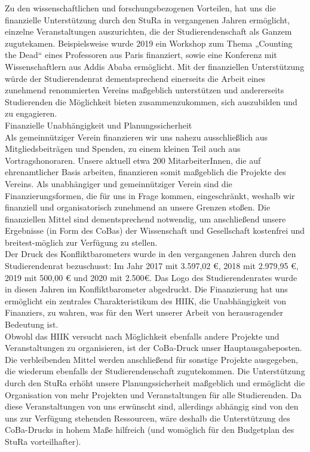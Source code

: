 {    Zu den wissenschaftlichen und forschungsbezogenen Vorteilen, hat uns die finanzielle Unterstützung durch den StuRa in vergangenen Jahren ermöglicht, einzelne Veranstaltungen auszurichten, die der Studierendenschaft als Ganzem zugutekamen. Beispielsweise wurde 2019 ein Workshop zum Thema „Counting the Dead“ eines Professoren aus Paris finanziert, sowie eine Konferenz mit Wissenschaftlern aus Addis Ababa ermöglicht. Mit der finanziellen Unterstützung würde der Studierendenrat dementsprechend einerseits die Arbeit eines zunehmend renommierten Vereins maßgeblich unterstützen und andererseits Studierenden die Möglichkeit bieten zusammenzukommen, sich auszubilden und zu engagieren.\\
    Finanzielle Unabhängigkeit und Planungssicherheit\\
    Als gemeinnütziger Verein finanzieren wir uns nahezu ausschließlich aus Mitgliedsbeiträgen und Spenden, zu einem kleinen Teil auch aus Vortragshonoraren. Unsere aktuell etwa 200 MitarbeiterInnen, die auf ehrenamtlicher Basis arbeiten, finanzieren somit maßgeblich die Projekte des Vereins. Als unabhängiger und gemeinnütziger Verein sind die Finanzierungsformen, die für uns in Frage kommen, eingeschränkt, weshalb wir finanziell und organisatorisch zunehmend an unsere Grenzen stoßen. Die finanziellen Mittel sind dementsprechend notwendig, um anschließend unsere Ergebnisse (in Form des CoBas) der Wissenschaft und Gesellschaft kostenfrei und breitest-möglich zur Verfügung zu stellen.\\
    Der Druck des Konfliktbarometers wurde in den vergangenen Jahren durch den Studierendenrat bezuschusst: Im Jahr 2017 mit 3.597,02 €, 2018 mit 2.979,95 €, 2019 mit 500,00 € und 2020 mit 2.500€. Das Logo des Studierendenrates wurde in diesen Jahren im Konfliktbarometer abgedruckt. Die Finanzierung hat uns ermöglicht ein zentrales Charakteristikum des HIIK, die Unabhängigkeit von Finanziers, zu wahren, was für den Wert unserer Arbeit von herausragender Bedeutung ist.\\
    Obwohl das HIIK versucht nach Möglichkeit ebenfalls andere Projekte und Veranstaltungen zu organisieren, ist der CoBa-Druck unser Hauptausgabeposten. Die verbleibenden Mittel werden anschließend für sonstige Projekte ausgegeben, die wiederum ebenfalls der Studierendenschaft zugutekommen. Die Unterstützung durch den StuRa erhöht unsere Planungssicherheit maßgeblich und ermöglicht die Organisation von mehr Projekten und Veranstaltungen für alle Studierenden. Da diese Veranstaltungen von uns erwünscht sind, allerdings abhängig sind von den uns zur Verfügung stehenden Ressourcen, wäre deshalb die Unterstützung des CoBa-Drucks in hohem Maße hilfreich (und womöglich für den Budgetplan des StuRa vorteilhafter).\\[1em]
}
